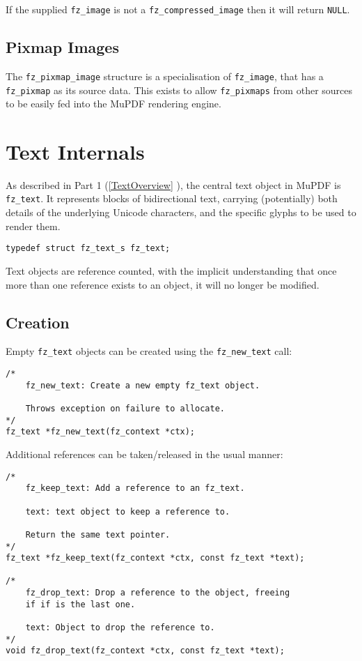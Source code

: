 \documentclass[oneside]{book}
\newcommand{\rjwref}[1] {\autoref{#1} \nameref{#1}}
\begin{document}
If the supplied \texttt{fz\_image} is not a \texttt{fz\_compressed\_image} then it will return \texttt{NULL}.

\section{Pixmap Images}

The \texttt{fz\_pixmap\_image} structure is a specialisation of \texttt{fz\_image}, that has a \texttt{fz\_pixmap} as its source data. This exists to allow \texttt{fz\_pixmaps} from other sources to be easily fed into the MuPDF rendering engine.

\chapter{Text Internals}
\label{Text}

As described in Part 1 (\rjwref{TextOverview}), the central text object in MuPDF is \texttt{fz\_text}. It represents blocks of bidirectional text, carrying (potentially) both details of the underlying Unicode characters, and the specific glyphs to be used to render them.

\begin{lstlisting}
typedef struct fz_text_s fz_text;
\end{lstlisting}

Text objects are reference counted, with the implicit understanding that once more than one reference exists to an object, it will no longer be modified.

\section{Creation}
\label{TextCreation}

Empty \texttt{fz\_text} objects can be created using the \texttt{fz\_new\_text} call:

\begin{lstlisting}
/*
	fz_new_text: Create a new empty fz_text object.

	Throws exception on failure to allocate.
*/
fz_text *fz_new_text(fz_context *ctx);
\end{lstlisting}

Additional references can be taken/released in the usual manner:

\begin{lstlisting}
/*
	fz_keep_text: Add a reference to an fz_text.

	text: text object to keep a reference to.

	Return the same text pointer.
*/
fz_text *fz_keep_text(fz_context *ctx, const fz_text *text);

/*
	fz_drop_text: Drop a reference to the object, freeing
	if if is the last one.

	text: Object to drop the reference to.
*/
void fz_drop_text(fz_context *ctx, const fz_text *text);
\end{lstlisting}
\end{document}
